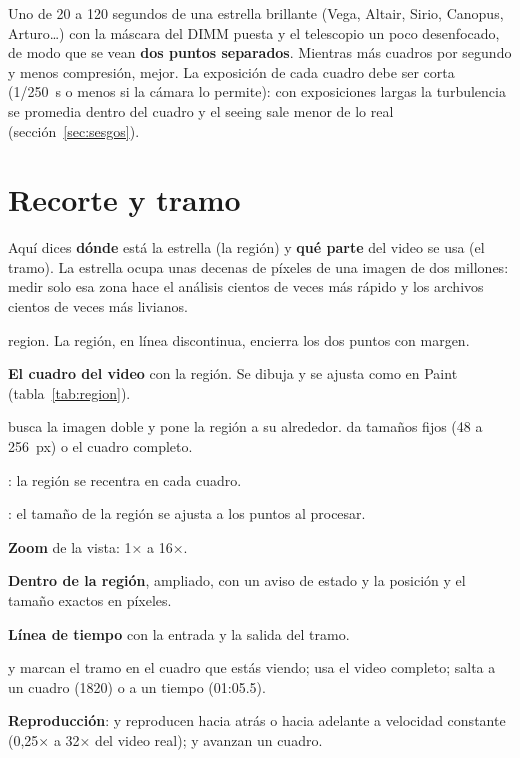 \begin{nota}
Uno de 20 a 120 segundos de una estrella brillante (Vega, Altair, Sirio, Canopus, Arturo\ldots) con la máscara del DIMM
puesta y el telescopio un poco desenfocado, de modo que se vean \textbf{dos puntos separados}. Mientras más cuadros por
segundo y menos compresión, mejor. La exposición de cada cuadro debe ser corta (1/250~s o menos si la cámara lo
permite): con exposiciones largas la turbulencia se promedia dentro del cuadro y el seeing sale menor de lo real
(sección~\ref{sec:sesgos}).
\end{nota}

\section{Recorte y tramo}\label{sec:recorte}

Aquí dices \textbf{dónde} está la estrella (la región) y \textbf{qué parte} del video se usa (el tramo). La estrella ocupa
unas decenas de píxeles de una imagen de dos millones: medir solo esa zona hace el análisis cientos de veces más
rápido y los archivos cientos de veces más livianos.

\begin{capturam}{region}{. La región, en línea discontinua, encierra los dos puntos con margen.}
\item \textbf{El cuadro del video} con la región. Se dibuja y se ajusta como en Paint (tabla~\ref{tab:region}).
\item {} busca la imagen doble y pone la región a su alrededor. 
da tamaños fijos (48 a 256~px) o el cuadro completo.
\item {}: la región se recentra en cada cuadro.
\item {}: el tamaño de la región se ajusta a los puntos al procesar.
\item \textbf{Zoom} de la vista: 1× a 16×.
\item \textbf{Dentro de la región}, ampliado, con un aviso de estado y la posición y el tamaño exactos en píxeles.
\item \textbf{Línea de tiempo} con la entrada y la salida del tramo.
\item \boton{[ Entrada} y \boton{Salida ]} marcan el tramo en el cuadro que estás viendo;  usa el video
completo;  salta a un cuadro (1820) o a un tiempo (01:05.5).
\item \textbf{Reproducción}: \boton{<<} y \boton{>>} reproducen hacia atrás o hacia adelante a velocidad constante
(0,25× a 32× del video real); \boton{<} y \boton{>} avanzan un cuadro.
\end{capturam}

